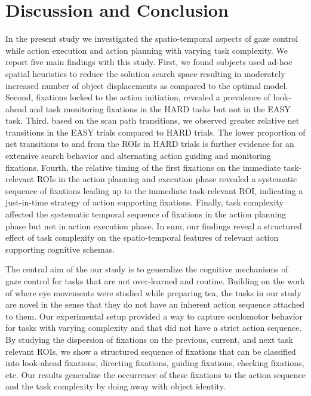 \section{Discussion and Conclusion}

In the present study we investigated the spatio-temporal aspects of gaze control while action execution and action planning with varying task complexity. We report five main findings with this study. First, we found subjects used ad-hoc spatial heuristics to reduce the solution search space resulting in moderately increased number of object displacements as compared to the optimal model. Second, fixations locked to the action initiation, revealed a prevalence of look-ahead and task monitoring fixations in the HARD tasks but not in the EASY task. Third, based on the scan path transitions, we observed greater relative net transitions in the EASY trials compared to HARD trials. The lower proportion of net transitions to and from the ROIs in HARD trials is further evidence for an extensive search behavior and alternating action guiding and monitoring fixations. Fourth, the relative timing of the first fixations on the immediate task-relevant ROIs in the action planning and execution phase revealed a systematic sequence of fixations leading up to the immediate task-relevant ROI, indicating a just-in-time strategy of action supporting fixations. Finally, task complexity affected the systematic temporal sequence of fixations in the action planning phase but not in action execution phase. In sum, our findings reveal a structured  effect of task complexity on the spatio-temporal features of relevant action supporting cognitive schemas.

The central aim of the our study is to generalize the cognitive mechanisms of gaze control for tasks that are not over-learned and routine. Building on the work of \citet{Land1999-ol} where eye movements were studied while preparing tea, the tasks in our study are novel in the sense that they do not have an inherent action sequence attached to them. Our experimental setup provided a way to capture oculomotor behavior for tasks with varying complexity and that did not have a strict action sequence. By studying the dispersion of fixations on the previous, current, and next task relevant ROIs, we show a structured sequence of fixations that can be classified into look-ahead fixations, directing fixations, guiding fixations, checking fixations, etc. Our results generalize the occurrence of these fixations to the action sequence and the task complexity by doing away with object identity. 

